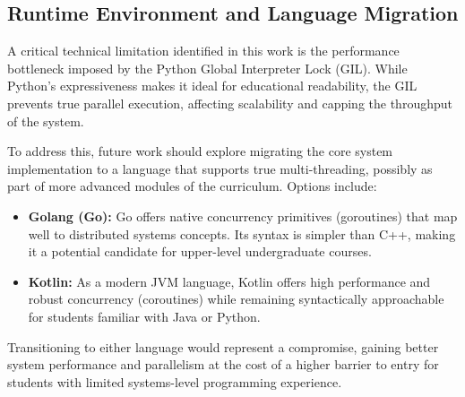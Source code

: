 \subsection{Runtime Environment and Language Migration}
A critical technical limitation identified in this work is the performance bottleneck imposed by the Python Global Interpreter Lock (GIL). While Python's expressiveness makes it ideal for educational readability, the GIL prevents true parallel execution, affecting scalability and capping the throughput of the system.

To address this, future work should explore migrating the core system implementation to a language that supports true multi-threading, possibly as part of more advanced modules of the curriculum. Options include:
\begin{itemize}
    \item \textbf{Golang (Go):} Go offers native concurrency primitives (goroutines) that map well to distributed systems concepts. Its syntax is simpler than C++, making it a potential candidate for upper-level undergraduate courses.
    \item \textbf{Kotlin:} As a modern JVM language, Kotlin offers high performance and robust concurrency (coroutines) while remaining syntactically approachable for students familiar with Java or Python.
\end{itemize}
Transitioning to either language would represent a compromise, gaining better system performance and parallelism at the cost of a higher barrier to entry for students with limited systems-level programming experience.
